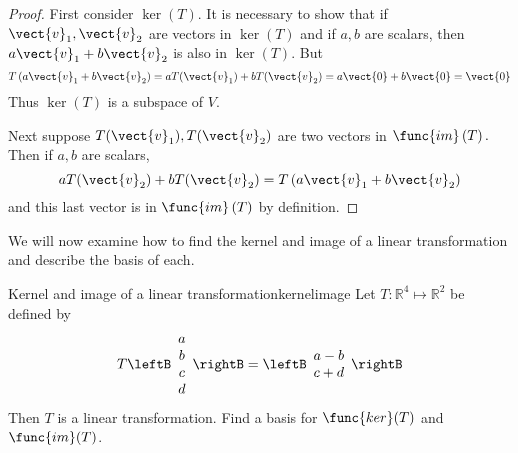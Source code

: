 \begin{proof}
First consider $\ker \left( T\right) .$ It is necessary to
show that if $\vect{v}_{1},\vect{v}_{2}$ are vectors in $\ker \left( T\right) $
and if $a,b$ are scalars, then $a\vect{v}_{1}+b\vect{v}_{2}$ is also in $\ker
\left( T\right) .$ But 
\begin{equation*}
T\left( a\vect{v}_{1}+b\vect{v}_{2}\right) =aT(\vect{v}_{1})+bT(\vect{v}_{2})=a\vect{0}+b\vect{0}=\vect{0}
\end{equation*}
Thus $\ker \left( T\right) $ is a subspace of $V$.

Next suppose $T(\vect{v}_{1}),T(\vect{v}_{2})$ are two vectors in $\func{im}\left(
T\right) .$ Then if $a,b$ are scalars, 
\begin{equation*}
aT(\vect{v}_{2})+bT(\vect{v}_{2})=T\left( a\vect{v}_{1}+b\vect{v}_{2}\right)
\end{equation*}
and this last vector is in $\func{im}\left( T\right) $ by definition. 
\end{proof}

We will now examine how to find the kernel and image of a linear transformation and describe the basis of each. 

\begin{example}{Kernel and image of a linear transformation}{kernelimage}
Let $T: \mathbb{R}^4 \mapsto \mathbb{R}^2$ be defined by
\[
T \leftB \begin{array}{c}
a \\
b \\
c \\
d
\end{array} \rightB = 
\leftB \begin{array}{c}
a - b \\ 
c + d
\end{array} \rightB
\]
Then $T$ is a linear transformation. Find a basis for $\func{ker}(T)$ and $\func{im}(T)$. 
\end{example}

